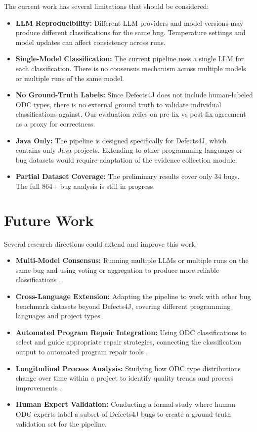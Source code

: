 \documentclass{iutbscthesis}
\begin{document}
The current work has several limitations that should be considered:

\begin{itemize}
    \item \textbf{LLM Reproducibility:} Different LLM providers and model versions may produce different classifications for the same bug. Temperature settings and model updates can affect consistency across runs.
    \item \textbf{Single-Model Classification:} The current pipeline uses a single LLM for each classification. There is no consensus mechanism across multiple models or multiple runs of the same model.
    \item \textbf{No Ground-Truth Labels:} Since Defects4J does not include human-labeled ODC types, there is no external ground truth to validate individual classifications against. Our evaluation relies on pre-fix vs post-fix agreement as a proxy for correctness.
    \item \textbf{Java Only:} The pipeline is designed specifically for Defects4J, which contains only Java projects. Extending to other programming languages or bug datasets would require adaptation of the evidence collection module.
    \item \textbf{Partial Dataset Coverage:} The preliminary results cover only 34 bugs. The full 864+ bug analysis is still in progress.
\end{itemize}

\section{Future Work}

Several research directions could extend and improve this work:

\begin{itemize}
    \item \textbf{Multi-Model Consensus:} Running multiple LLMs or multiple runs on the same bug and using voting or aggregation to produce more reliable classifications \cite{colavito2024llm}.
    \item \textbf{Cross-Language Extension:} Adapting the pipeline to work with other bug benchmark datasets beyond Defects4J, covering different programming languages and project types.
    \item \textbf{Automated Program Repair Integration:} Using ODC classifications to select and guide appropriate repair strategies, connecting the classification output to automated program repair tools \cite{durieux2018automatic}.
    \item \textbf{Longitudinal Process Analysis:} Studying how ODC type distributions change over time within a project to identify quality trends and process improvements \cite{catolino2019not}.
    \item \textbf{Human Expert Validation:} Conducting a formal study where human ODC experts label a subset of Defects4J bugs to create a ground-truth validation set for the pipeline.
\end{itemize}
\end{document}
